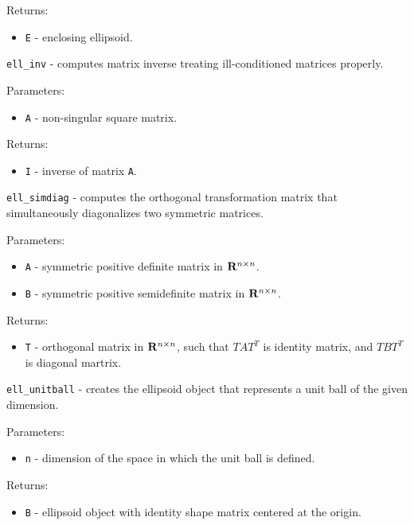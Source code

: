 Returns:
\begin{itemize}
\item {\tt E} - enclosing ellipsoid.
\end{itemize}

\newpage

{\Large {\tt ell\_inv}} - computes matrix inverse treating ill-conditioned matrices properly.

Parameters:
\begin{itemize}
\item {\tt A} - non-singular square matrix.
\end{itemize}

Returns:
\begin{itemize}
\item {\tt I} - inverse of matrix {\tt A}.
\end{itemize}

\newpage

{\Large {\tt ell\_simdiag}} - computes the orthogonal transformation matrix
that simultaneously diagonalizes two symmetric matrices.

Parameters:
\begin{itemize}
\item {\tt A} - symmetric positive definite matrix in ${\bf R}^{n\times n}$.
\item {\tt B} - symmetric positive semidefinite matrix in ${\bf R}^{n\times n}$.
\end{itemize}

Returns:
\begin{itemize}
\item {\tt T} - orthogonal matrix in ${\bf R}^{n\times n}$, such that
$TAT^T$ is identity matrix, and $TBT^T$ is diagonal martrix.
\end{itemize}

\newpage

{\Large {\tt ell\_unitball}} - creates the ellipsoid object that represents
a unit ball of the given dimension.

Parameters:
\begin{itemize}
\item {\tt n} - dimension of the space in which the unit ball is defined.
\end{itemize}

Returns:
\begin{itemize}
\item {\tt B} - ellipsoid object with identity shape matrix centered at the
origin.
\end{itemize}

